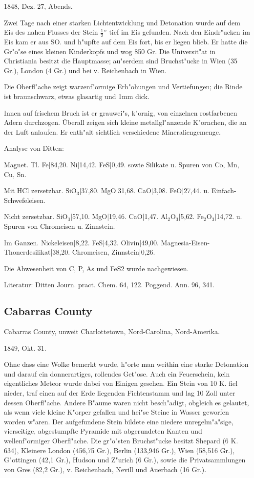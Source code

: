 \documentclass[a4paper, 11pt, oneside]{article}
\begin{document}
1848, Dez. 27, Abends.

Zwei Tage nach einer starken Lichtentwicklung und Detonation wurde auf dem Eis des nahen Flusses der Stein $\frac{1}{2}$” tief im Eis gefunden. Nach den Eindr"ucken im Eis kam er aus SO. und h"upfte auf dem Eis fort, bis er liegen blieb. Er hatte die Gr"o"se eines kleinen Kinderkopfs und wog 850 Gr. Die Universit"at in Christiania besitzt die Hauptmasse; au"serdem sind Bruchst"ucke in Wien (35 Gr.), London (4 Gr.) und bei v. Reichenbach in Wien.

Die Oberfl"ache zeigt warzenf"ormige Erh"ohungen und Vertiefungen; die Rinde ist braunschwarz, etwas glasartig und 1mm dick.

Innen auf frischem Bruch ist er grauwei"s, k"ornig, von einzelnen rostfarbenen Adern durchzogen. Überall zeigen sich kleine metallgl"anzende K"ornchen, die an der Luft anlaufen. Er enth"alt sichtlich verschiedene Mineraliengemenge.

Analyse von Ditten:

Magnet. Tl.
Fe|84,20.  
Ni|14,42.  
FeS|0,49.  
sowie Silikate u. Spuren von Co, Mn, Cu, Sn.

Mit HCl zersetzbar.  
SiO$_{3}$|37,80.  
MgO|31,68.  
CaO|3,08.  
FeO|27,44.  
u. Einfach-Schwefeleisen.

Nicht zersetzbar.  
SiO$_{3}$|57,10.  
MgO|19,46.  
CaO|1,47.  
Al$_{2}$O$_{3}$|5,62.  
Fe$_{2}$O$_{3}$|14,72.  
u. Spuren von Chromeisen u. Zinnstein.

Im Ganzen.  
Nickeleisen|8,22.  
FeS|4,32.  
Olivin|49,00.  
Magnesia-Eisen-Thonerdesilikat|38,20.  
Chromeisen, Zinnstein|0,26.

Die Abwesenheit von C, P, As und FeS2 wurde nachgewiesen.

Literatur: Ditten Journ. pract. Chem. 64, 122. Poggend. Ann. 96, 341.

\subsection{Cabarras County}

Cabarras County, unweit Charlottetown, Nord-Carolina, Nord-Amerika.

1849, Okt. 31.

Ohne dass eine Wolke bemerkt wurde, h"orte man weithin eine starke Detonation und darauf ein donnerartiges, rollendes Get"ose. Auch ein Feuerschein, kein eigentliches Meteor wurde dabei von Einigen gesehen. Ein Stein von 10 K. fiel nieder, traf einen auf der Erde liegenden Fichtenstamm und lag 10 Zoll unter dessen Oberfl"ache. Andere B"aume waren nicht besch"adigt, obgleich es gelautet, als wenn viele kleine K"orper gefallen und hei"se Steine in Wasser geworfen worden w"aren. Der aufgefundene Stein bildete eine niedere unregelm"a"sige, vierseitige, abgestumpfte Pyramide mit abgerundeten Kanten und wellenf"ormiger Oberfl"ache. Die gr"o"sten Bruchst"ucke besitzt Shepard (6 K. 634), Kleinere London (456,75 Gr.), Berlin (133,946 Gr.), Wien (58,516 Gr.), G"ottingen (42,1 Gr.), Hudson und Z"urich (6 Gr.), sowie die Privatsammlungen von Gres (82,2 Gr.), v. Reichenbach, Nevill und Auerbach (16 Gr.).
\end{document}
